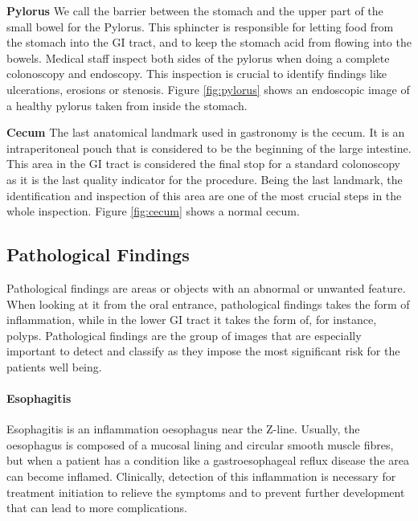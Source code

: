 \textbf{Pylorus}
We call the barrier between the stomach and the upper part of the small bowel for the Pylorus. This sphincter is responsible for letting food from the stomach into the GI tract, and to keep the stomach acid from flowing into the bowels.
Medical staff inspect both sides of the pylorus when doing a complete colonoscopy and endoscopy. This inspection is crucial to identify findings like ulcerations, erosions or stenosis.  
Figure \ref{fig:pylorus} shows an endoscopic image of a healthy pylorus taken from inside the stomach.

\textbf{Cecum}
The last anatomical landmark used in gastronomy is the cecum. It is an intraperitoneal pouch that is considered to be the beginning of the large intestine. This area in the GI tract is considered the final stop for a standard colonoscopy as it is the last quality indicator for the procedure.
Being the last landmark, the identification and inspection of this area are one of the most crucial steps in the whole inspection. 
Figure \ref{fig:cecum} shows a normal cecum.


\subsection{Pathological Findings}
Pathological findings are areas or objects with an abnormal or unwanted feature. When looking at it from the oral entrance, pathological findings takes the form of inflammation, while in the lower GI tract it takes the form of, for instance, polyps. 
Pathological findings are the group of images that are especially important to detect and classify as they impose the most significant risk for the patients well being. 


\paragraph{Esophagitis}
Esophagitis is an inflammation oesophagus near the Z-line. Usually, the oesophagus is composed of a mucosal lining and circular smooth muscle fibres, but when a patient has a condition like a gastroesophageal reflux disease the area can become inflamed. 
Clinically, detection of this inflammation is necessary for treatment initiation to relieve the symptoms and to prevent further development that can lead to more complications.


